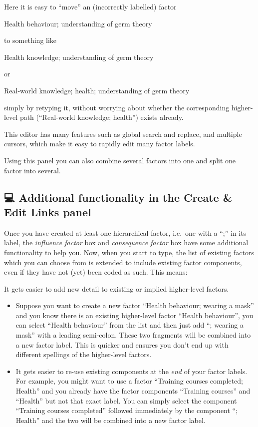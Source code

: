 \documentclass[
]{book}
\begin{document}
Here it is easy to ``move'' an (incorrectly labelled) factor

Health behaviour; understanding of germ theory

to something like

Health knowledge; understanding of germ theory

or

Real-world knowledge; health; understanding of germ theory

simply by retyping it, without worrying about whether the corresponding higher-level path (``Real-world knowledge; health'') exists already.

This editor has many features such as global search and replace, and multiple cursors, which make it easy to rapidly edit many factor labels.

Using this panel you can also combine several factors into one and split one factor into several.

\hypertarget{additional-functionality-in-the-create-edit-links-panel}{%
\subsection{💻 Additional functionality in the Create \& Edit Links panel}\label{additional-functionality-in-the-create-edit-links-panel}}

Once you have created at least one hierarchical factor, i.e.~one with a ``;'' in its label, the \emph{influence factor} box and \emph{consequence factor} box have some additional functionality to help you. Now, when you start to type, the list of existing factors which you can choose from is extended to include existing factor components, even if they have not (yet) been coded as such. This means:

It gets easier to add new detail to existing or implied higher-level factors.

\begin{itemize}
\item
  Suppose you want to create a new factor ``Health behaviour; wearing a mask'' and you know there is an existing higher-level factor ``Health behaviour'', you can select ``Health behaviour'' from the list and then just add ``; wearing a mask'' with a leading semi-colon. These two fragments will be combined into a new factor label. This is quicker and ensures you don't end up with different spellings of the higher-level factors.
\item
  It gets easier to re-use existing components at the \emph{end} of your factor labels. For example, you might want to use a factor ``Training courses completed; Health'' and you already have the factor components ``Training courses'' and ``Health'' but not that exact label. You can simply select the component ``Training courses completed'' followed immediately by the component ``; Health'' and the two will be combined into a new factor label.
\end{itemize}
\end{document}
